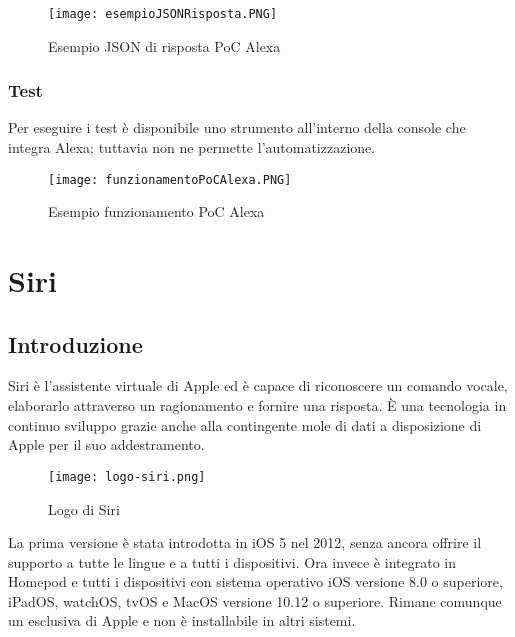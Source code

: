 		\begin{figure}[htbp]
			\begin{center}
				\texttt{[image: esempioJSONRisposta.PNG]}
				\caption{Esempio JSON di risposta PoC Alexa}
			\end{center}
		\end{figure}
	
	\pagebreak
		
		\subsubsection{Test} \mbox{}
		Per eseguire i test è disponibile uno strumento all'interno della console che integra Alexa; tuttavia non ne permette l'automatizzazione.
		
		\begin{figure}[htbp]
			\begin{center}
				\texttt{[image: funzionamentoPoCAlexa.PNG]}
				\caption{Esempio funzionamento PoC Alexa}
			\end{center}
		\end{figure}
\pagebreak
\section{Siri}
	\subsection{Introduzione}
	Siri è l'assistente virtuale di Apple ed è capace di riconoscere un comando vocale, elaborarlo attraverso un ragionamento e fornire una risposta. È una tecnologia in continuo sviluppo grazie anche alla contingente mole di dati a disposizione di Apple per il suo addestramento.
	
	\begin{figure}[htbp]
		\begin{center}
			\texttt{[image: logo-siri.png]}
			\caption{Logo di Siri}
		\end{center}
	\end{figure}
	
	La prima versione è stata introdotta in iOS 5 nel 2012, senza ancora offrire il supporto a tutte le lingue e a tutti i dispositivi. Ora invece è integrato in Homepod e tutti i dispositivi con sistema operativo iOS versione 8.0 o superiore, iPadOS, watchOS, tvOS e MacOS versione 10.12 o superiore. Rimane comunque un esclusiva di Apple e non è installabile in altri sistemi.
